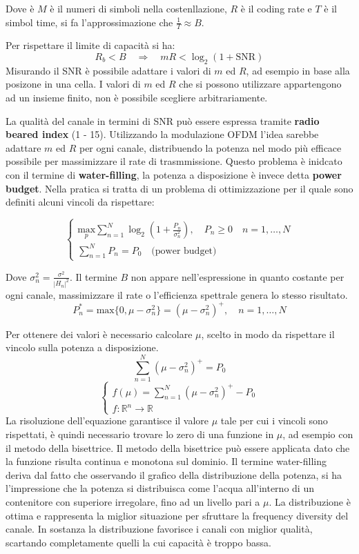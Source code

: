 Dove è $M$ è il numeri di simboli nella costenllazione, $R$ è il coding rate e $T$ è il simbol time, si fa l'approssimazione che $\frac{1}{T} \approx B$. 


Per rispettare il limite di capacità si ha:
\[
    R_b < B \quad \Rightarrow \quad mR < \log_2 (1 + \text{SNR})
\] 
Misurando il SNR è possibile adattare i valori di $m$ ed $R$, ad esempio in base alla posizone in una cella.
I valori di $m$ ed $R$ che si possono utilizzare appartengono ad un insieme finito, non è possibile scegliere arbitrariamente.

La qualità del canale in termini di SNR può essere espressa tramite \textbf{radio beared index} (1 - 15).
Utilizzando la modulazione OFDM l'idea sarebbe adattare $m$ ed $R$ per ogni canale, distribuendo la potenza nel modo più efficace possibile per massimizzare il rate di trasmmissione. Questo problema è inidcato con il termine di \textbf{water-filling}, la potenza a disposizione è invece detta \textbf{power budget}. Nella pratica si tratta di un problema di ottimizzazione per il quale sono definiti alcuni vincoli da rispettare:


\[
    \begin{cases}
       \underset{p}{\text{max}} \sum_{n=1}^{N} \log_2(1 + \frac{P_n}{\sigma_n^2}), \quad P_n \geq 0 \quad n = 1, \ldots, N \\
       \sum_{n=1}^{N} P_n = P_0 \quad \text{(power budget)}
    \end{cases}    
\]

Dove $\sigma_n^2 = \frac{\sigma^2}{\left| H_n \right| ^2}$. Il termine $B$ non appare nell'espressione in quanto costante per ogni canale, massimizzare il rate o l'efficienza spettrale genera lo stesso risultato.
\[
    P_n^* = \text{max} \{ 0, \mu - \sigma_n^2    \} = (\mu - \sigma_n^2)^+, \quad n = 1, \ldots, N
\]

Per ottenere dei valori è necessario calcolare $\mu$, scelto in modo da rispettare il vincolo sulla potenza a disposizione.
\[
    \sum_{n=1}^{N} (\mu - \sigma_n^2)^+ = P_0
\]
\[
    \begin{cases}
        f(\mu) = \sum_{n=1}^{N} (\mu - \sigma_n^2)^+ - P_0 \\
        f: \mathbb{R}^n \rightarrow \mathbb{R}
    \end{cases}
\]
La risoluzione dell'equazione garantisce il valore $\mu$ tale per cui i vincoli sono rispettati, è quindi necessario trovare lo zero di una funzione in $\mu$, ad esempio con il metodo della bisettrice. Il metodo della bisettrice può essere applicata dato che la funzione risulta continua e monotona sul dominio.
Il termine water-filling deriva dal fatto che osservando il grafico della distribuzione della potenza, si ha l'impressione che la potenza si distribuisca come l'acqua all'interno di un contenitore con superiore irregolare, fino ad un livello pari a $\mu$.
La distribuzione è ottima e rappresenta la miglior situazione per sfruttare la frequency diversity del canale. In sostanza la distribuzione favorisce i canali con miglior qualità, scartando completamente quelli la cui capacità è troppo bassa.






